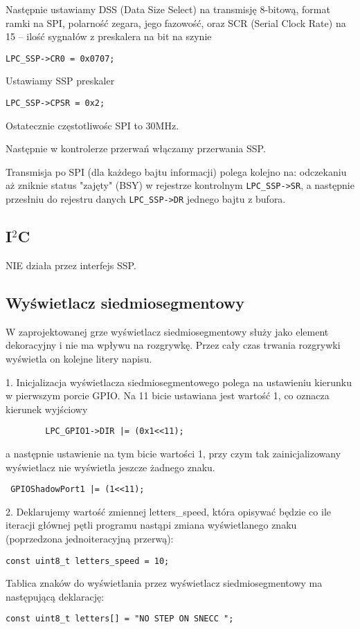 \documentclass[a4paper,12pt,twoside]{article}
\theoremstyle{plain}
\theoremstyle{definition}
\theoremstyle{remark}
\begin{document}
Następnie ustawiamy DSS (Data Size Select) na transmisję 8-bitową, format ramki na SPI, polarność zegara, jego fazowość, oraz SCR (Serial Clock Rate) na 15 -- ilość sygnałów z preskalera na bit na szynie
\begin{verbatim}
LPC_SSP->CR0 = 0x0707;
\end{verbatim}

Ustawiamy SSP preskaler
\begin{verbatim}
LPC_SSP->CPSR = 0x2;
\end{verbatim}

Ostatecznie częstotliwośc SPI to 30MHz.

Następnie w kontrolerze przerwań włączamy przerwania SSP.

Transmisja po SPI (dla każdego bajtu informacji) polega kolejno na: odczekaniu aż zniknie status "zajęty" (BSY) w rejestrze kontrolnym \verb|LPC_SSP->SR|,
a następnie przesłniu do rejestru danych \verb|LPC_SSP->DR| jednego bajtu z bufora. 


\subsection{I$^2$C}
NIE działa przez interfejs SSP.

\subsection{Wyświetlacz siedmiosegmentowy}
W zaprojektowanej grze wyświetlacz siedmiosegmentowy służy jako element dekoracyjny i nie ma wpływu na rozgrywkę. Przez cały czas trwania rozgrywki wyświetla on kolejne litery napisu.

1. Inicjalizacja wyświetlacza siedmiosegmentowego polega na ustawieniu kierunku w pierwszym porcie GPIO. Na 11 bicie ustawiana jest wartość 1, co oznacza kierunek wyjściowy
\begin{verbatim}
		LPC_GPIO1->DIR |= (0x1<<11);
\end{verbatim}
a następnie ustawienie na tym bicie wartości 1, przy czym tak zainicjalizowany wyświetlacz nie wyświetla jeszcze żadnego znaku.
\begin{verbatim}
 GPIOShadowPort1 |= (1<<11);
\end{verbatim}

2. Deklarujemy wartość zmiennej letters\_speed, która opisywać będzie co ile iteracji głównej pętli programu nastąpi zmiana wyświetlanego znaku (poprzedzona jednoiteracyjną przerwą):
\begin{verbatim}
const uint8_t letters_speed = 10;
\end{verbatim}
Tablica znaków do wyświetlania przez wyświetlacz siedmiosegmentowy ma następującą deklarację:
\begin{verbatim}
const uint8_t letters[] = "NO STEP ON SNECC ";
\end{verbatim}
\end{document}
